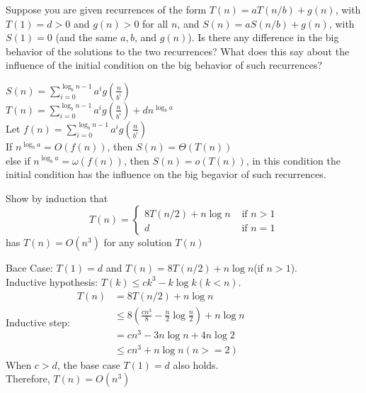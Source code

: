 \documentclass[a4paper, justified]{tufte-handout}
\begin{document}
\begin{problem}[CS 4.3-18]
Suppose you are given recurrences of the form $T(n) = aT(n/b) + g(n)$, with $T(1) = d > 0$ and $g(n) > 0$ for all $n$, and $S(n) = aS(n/b) + g(n)$, with $S(1) = 0$ (and the same $a, b$, and $g(n)$). Is there any difference in the big behavior of the solutions to the two recurrences? What does this say about the influence of the initial condition on the big behavior of such recurrences?
\end{problem}

\begin{solution}
  $S(n) = \sum _{i = 0} ^{\log _b n-1} a^ig(\frac{n}{b^i})$\\
  $T(n) = \sum _{i = 0} ^{\log _b n-1} a^ig(\frac{n}{b^i}) + dn^{\log _b a}$\\
  Let $f(n) = \sum _{i = 0} ^{\log _b n-1} a^ig(\frac{n}{b^i})$\\
  If $n^{\log _b a} = O(f(n))$, then $S(n) = \Theta (T(n))$\\
  else if $n^{\log _b a} = \omega(f(n))$, then $S(n) = o(T(n))$, in this condition the initial condition has the influence on the big begavior of such recurrences.
\end{solution}

\begin{problem}[CS 4.5-8]
Show by induction that
$$
  T(n)= \begin{cases}8 T(n / 2)+n \log n & \text { if } n>1 \\ d & \text { if } n=1\end{cases}
$$
has $T(n) = O(n^3)$ for any solution $T(n)$
\end{problem}

\begin{solution}
  Bace Case: $T(1) = d$ and $T(n) = 8 T(n / 2)+n \log n$(if $n > 1$).\\
  Inductive hypothesis: $T(k) \leq ck^3 - k \log k(k < n)$.\\
  Inductive step:
  $\begin{aligned}
      T(n) & = 8 T(n / 2)+n \log n                                          \\
           & \leq 8(\frac{cn^3}{8} - \frac{n}{2}\log \frac{n}{2}) + n\log n \\
           & = cn^3 -3n\log n + 4n\log 2                                    \\
           & \leq cn^3 + n\log n(n >= 2)
    \end{aligned}$\\
  When $c > d$, the base case $T(1) = d$ also holds.\\
  Therefore, $T(n) = O(n^3)$
\end{solution}
\end{document}
